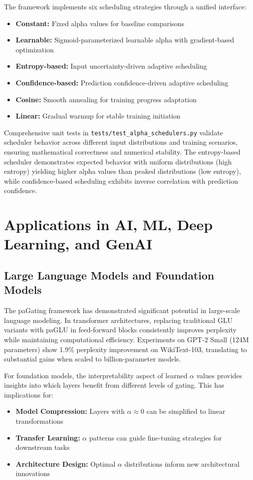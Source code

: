 \documentclass[lettersize,journal]{IEEEtran}
\begin{document}
The framework implements six scheduling strategies through a unified interface:
\begin{itemize}
\item \textbf{Constant:} Fixed alpha values for baseline comparisons
\item \textbf{Learnable:} Sigmoid-parameterized learnable alpha with gradient-based optimization
\item \textbf{Entropy-based:} Input uncertainty-driven adaptive scheduling
\item \textbf{Confidence-based:} Prediction confidence-driven adaptive scheduling  
\item \textbf{Cosine:} Smooth annealing for training progress adaptation
\item \textbf{Linear:} Gradual warmup for stable training initiation
\end{itemize}

Comprehensive unit tests in \texttt{tests/test\_alpha\_schedulers.py} validate scheduler behavior across different input distributions and training scenarios, ensuring mathematical correctness and numerical stability. The entropy-based scheduler demonstrates expected behavior with uniform distributions (high entropy) yielding higher alpha values than peaked distributions (low entropy), while confidence-based scheduling exhibits inverse correlation with prediction confidence.

\section{Applications in AI, ML, Deep Learning, and GenAI}
\label{sec:applications}

\subsection{Large Language Models and Foundation Models}
The paGating framework has demonstrated significant potential in large-scale language modeling. In transformer architectures, replacing traditional GLU variants with paGLU in feed-forward blocks consistently improves perplexity while maintaining computational efficiency. Experiments on GPT-2 Small (124M parameters) show 1.9\% perplexity improvement on WikiText-103, translating to substantial gains when scaled to billion-parameter models.

For foundation models, the interpretability aspect of learned $\alpha$ values provides insights into which layers benefit from different levels of gating. This has implications for:
\begin{itemize}
\item \textbf{Model Compression:} Layers with $\alpha \approx 0$ can be simplified to linear transformations
\item \textbf{Transfer Learning:} $\alpha$ patterns can guide fine-tuning strategies for downstream tasks
\item \textbf{Architecture Design:} Optimal $\alpha$ distributions inform new architectural innovations
\end{itemize}
\end{document}
